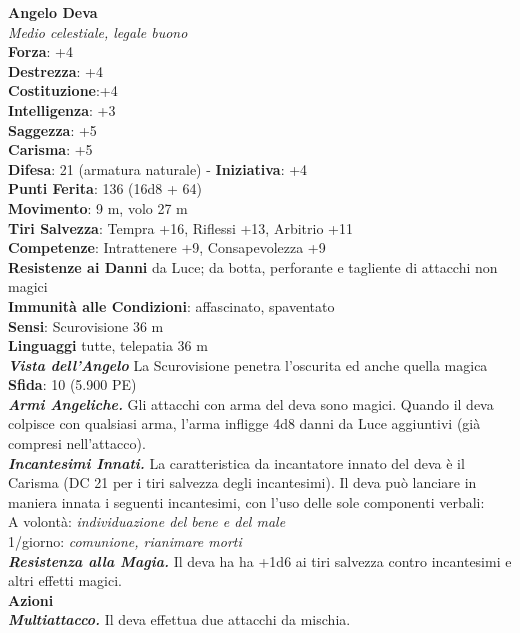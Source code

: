 \begin{multicols}{2}
\medskip\textbf{Angelo Deva}\\
\emph{Medio celestiale, legale buono}\\
\textbf{Forza}: +4\\
\textbf{Destrezza}: +4\\
\textbf{Costituzione}:+4\\
\textbf{Intelligenza}: +3\\
\textbf{Saggezza}: +5\\
\textbf{Carisma}: +5\\
\textbf{Difesa}: 21 (armatura naturale) - \textbf{Iniziativa}: +4\\
\textbf{Punti Ferita}: 136 (16d8 + 64)\\
\textbf{Movimento}: 9 m, volo 27 m\\
\textbf{Tiri Salvezza}: Tempra +16, Riflessi +13, Arbitrio +11\\
\textbf{Competenze}: Intrattenere +9, Consapevolezza +9\\
\textbf{Resistenze ai Danni} da Luce; da botta, perforante e tagliente di attacchi non magici\\
\textbf{Immunità alle Condizioni}: affascinato, spaventato\\
\textbf{Sensi}: Scurovisione 36 m\\
\textbf{Linguaggi} tutte, telepatia 36 m\\
\emph{\textbf{Vista dell'Angelo}} La Scurovisione penetra l'oscurita ed anche quella magica\\
\textbf{Sfida}: 10 (5.900 PE)\smallskip\\
\emph{\textbf{Armi Angeliche.}} Gli attacchi con arma del deva sono magici. Quando il deva colpisce con qualsiasi arma, l'arma infligge 4d8 danni da Luce aggiuntivi (già compresi nell'attacco).\\
\emph{\textbf{Incantesimi Innati.}} La caratteristica da incantatore innato del deva è il Carisma (DC  21 per i tiri salvezza degli incantesimi). Il deva può lanciare in maniera innata i seguenti incantesimi, con l'uso delle sole componenti verbali: \\
A volontà: \emph{individuazione del bene e del male}\\
1/giorno: \emph{comunione, rianimare morti}\\
\emph{\textbf{Resistenza alla Magia.}} Il deva ha ha +1d6 ai tiri salvezza contro incantesimi e altri effetti magici.\\
\smallskip\textbf{Azioni}\\
\emph{\textbf{Multiattacco.}} Il deva effettua due attacchi da mischia.\\

\end{multicols}
